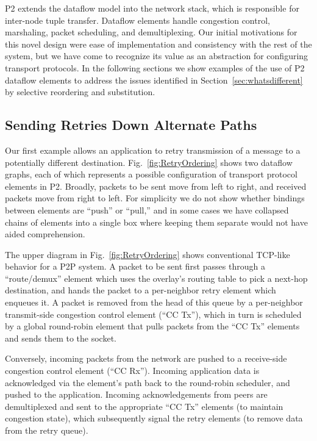 P2 extends the dataflow model into the network stack, which is responsible
for inter-node tuple transfer.  Dataflow elements handle congestion
control, marshaling, packet scheduling, and demultiplexing.  Our
initial motivations for this novel design were ease of implementation
and consistency with the rest of the system, but we have come to
recognize its value as an abstraction for configuring transport protocols.  In the
following sections we show examples of the use of P2 dataflow elements
to address the issues identified in Section~\ref{sec:whatsdifferent}
by selective reordering and substitution.

\subsection{Sending Retries Down Alternate Paths}

Our first example allows an application to retry transmission of a
message to a potentially different destination.
Fig.~\ref{fig:RetryOrdering} shows two dataflow graphs, each of which
represents a possible configuration of transport protocol elements in
P2.  Broadly, packets to be sent move from left to right, and received
packets move from right to left.  For simplicity we do not show
whether bindings between elements are ``push'' or ``pull,'' and in
some cases we have collapsed chains of elements into a single box
where keeping them separate would not have aided comprehension.    

The upper diagram in Fig.~\ref{fig:RetryOrdering} shows conventional
TCP-like behavior for a P2P system.  A packet to be sent first passes
through a ``route/demux'' element which uses the overlay's routing
table to pick a next-hop destination, and hands the packet to a
per-neighbor retry element which enqueues it.  A packet is removed
from the head of this queue by a per-neighbor transmit-side congestion
control element (``CC Tx''), which in turn is scheduled by a global
round-robin element that pulls packets from the ``CC Tx'' elements
and sends them to the socket. 

Conversely, incoming packets from the network are pushed to a
receive-side congestion control element (``CC Rx'').
Incoming application data is acknowledged via the element's
path back to the round-robin scheduler, and pushed to the application.
Incoming acknowledgements from peers are demultiplexed and sent to the
appropriate ``CC Tx'' elements (to maintain congestion state), which
subsequently signal the retry elements (to remove data from the retry queue). 

